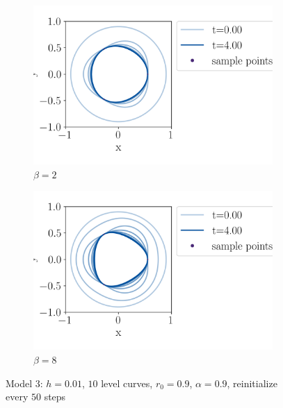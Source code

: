 \begin{figure}
    \centering
    \begin{subfigure}[h]{0.49\textwidth}
        \centering
        \includegraphics[width=\linewidth]{figures/Results/Three-points/model3/three-a9-b2-t4-conts.png}
        \caption{$\beta=2$}
        \label{fig:m3-three-b2}
    \end{subfigure}%
    \begin{subfigure}[h]{0.49\textwidth}
        \centering
        \includegraphics[width=\linewidth]{figures/Results/Three-points/model3/three-a9-b8-t4-conts.png}
        \caption{$\beta=8$}
        \label{fig:m3-three-b8}
    \end{subfigure}
\caption[Model 3 - Triangle, $\beta=2$ and $\beta=8$]{Model 3: $h=0.01$, $10$ level curves, $r_0=0.9$, $\alpha=0.9$, reinitialize every $50$ steps}
\label{fig:m3-three-points-conts}
\end{figure}

